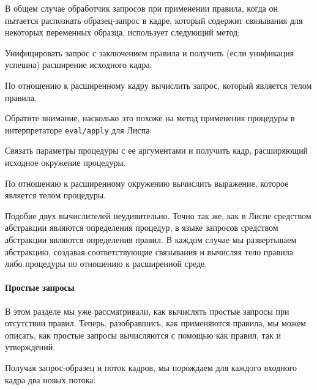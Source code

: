 В общем случае обработчик запросов при применении правила, когда он 
пытается распознать образец-запрос в кадре, который содержит связывания 
для некоторых переменных образца,  использует следующий метод:

\begin{plainlist}
\item
Унифицировать запрос с заключением правила и
получить (если унификация успешна) расширение исходного кадра.

\item
По отношению к расширенному кадру вычислить запрос,
который является телом правила.
\end{plainlist}

Обратите внимание, насколько это похоже на метод
применения процедуры в интерпретаторе {\tt eval/apply} для
Лиспа:

\begin{plainlist}
\item
Связать параметры процедуры с ее аргументами и
получить кадр, расширяющий исходное окружение процедуры.

\item
По отношению к расширенному окружению вычислить
выражение, которое является телом процедуры.
\end{plainlist}
Подобие двух вычислителей неудивительно.  Точно так же, как в
Лиспе средством абстракции являются определения процедур, в языке
запросов средством абстракции являются определения правил.  В каждом
случае мы развертываем абстракцию, создавая соответствующие связывания
и вычисляя тело правила либо процедуры по отношению к расширенной
среде.

\paragraph{Простые запросы}

В этом разделе мы уже 
рассматривали, как вычислять простые
запросы при отсутствии правил.  Теперь, разобравшись, как
применяются правила, мы можем описать, как простые запросы вычисляются с
помощью как правил, так и утверждений.

Получая запрос-образец и поток кадров, мы порождаем для
каждого входного кадра два новых потока:


